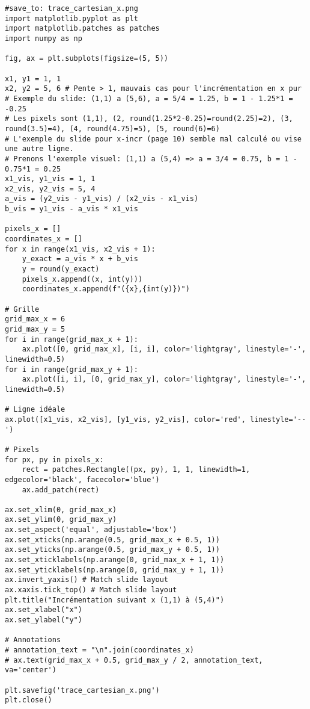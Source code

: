 \documentclass{article}
\begin{document}
\begin{verbatim}
#save_to: trace_cartesian_x.png
import matplotlib.pyplot as plt
import matplotlib.patches as patches
import numpy as np

fig, ax = plt.subplots(figsize=(5, 5))

x1, y1 = 1, 1
x2, y2 = 5, 6 # Pente > 1, mauvais cas pour l'incrémentation en x pur
# Exemple du slide: (1,1) a (5,6), a = 5/4 = 1.25, b = 1 - 1.25*1 = -0.25
# Les pixels sont (1,1), (2, round(1.25*2-0.25)=round(2.25)=2), (3, round(3.5)=4), (4, round(4.75)=5), (5, round(6)=6)
# L'exemple du slide pour x-incr (page 10) semble mal calculé ou vise une autre ligne.
# Prenons l'exemple visuel: (1,1) a (5,4) => a = 3/4 = 0.75, b = 1 - 0.75*1 = 0.25
x1_vis, y1_vis = 1, 1
x2_vis, y2_vis = 5, 4
a_vis = (y2_vis - y1_vis) / (x2_vis - x1_vis)
b_vis = y1_vis - a_vis * x1_vis

pixels_x = []
coordinates_x = []
for x in range(x1_vis, x2_vis + 1):
    y_exact = a_vis * x + b_vis
    y = round(y_exact)
    pixels_x.append((x, int(y)))
    coordinates_x.append(f"({x},{int(y)})")

# Grille
grid_max_x = 6
grid_max_y = 5
for i in range(grid_max_x + 1):
    ax.plot([0, grid_max_x], [i, i], color='lightgray', linestyle='-', linewidth=0.5)
for i in range(grid_max_y + 1):
    ax.plot([i, i], [0, grid_max_y], color='lightgray', linestyle='-', linewidth=0.5)

# Ligne idéale
ax.plot([x1_vis, x2_vis], [y1_vis, y2_vis], color='red', linestyle='--')

# Pixels
for px, py in pixels_x:
    rect = patches.Rectangle((px, py), 1, 1, linewidth=1, edgecolor='black', facecolor='blue')
    ax.add_patch(rect)

ax.set_xlim(0, grid_max_x)
ax.set_ylim(0, grid_max_y)
ax.set_aspect('equal', adjustable='box')
ax.set_xticks(np.arange(0.5, grid_max_x + 0.5, 1))
ax.set_yticks(np.arange(0.5, grid_max_y + 0.5, 1))
ax.set_xticklabels(np.arange(0, grid_max_x + 1, 1))
ax.set_yticklabels(np.arange(0, grid_max_y + 1, 1))
ax.invert_yaxis() # Match slide layout
ax.xaxis.tick_top() # Match slide layout
plt.title("Incrémentation suivant x (1,1) à (5,4)")
ax.set_xlabel("x")
ax.set_ylabel("y")

# Annotations
# annotation_text = "\n".join(coordinates_x)
# ax.text(grid_max_x + 0.5, grid_max_y / 2, annotation_text, va='center')

plt.savefig('trace_cartesian_x.png')
plt.close()
\end{verbatim}
\end{document}
